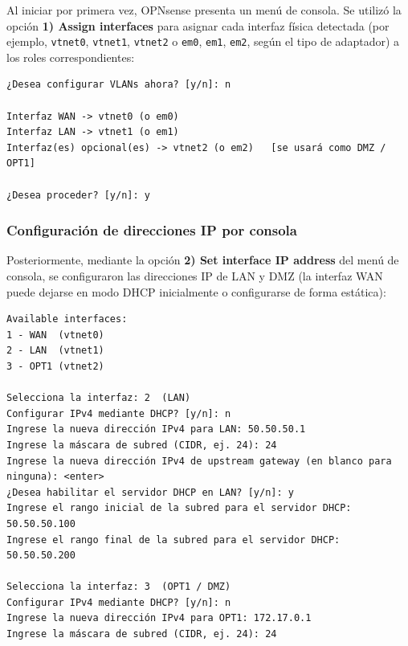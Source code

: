 \documentclass{article}
\renewcommand{\_}{\oldunderscore\hskip0pt\relax}
\begin{document}
Al iniciar por primera vez, OPNsense presenta un menú de consola. Se
utilizó la opción \textbf{1) Assign interfaces} para asignar cada
interfaz física detectada (por ejemplo, \texttt{vtnet0},
\texttt{vtnet1}, \texttt{vtnet2} o \texttt{em0}, \texttt{em1},
\texttt{em2}, según el tipo de adaptador) a los roles correspondientes:

\begin{Verbatim}[fontsize=\footnotesize,frame=single,rulecolor=\color{codebg},fillcolor=\color{codebg},framesep=2mm,xleftmargin=1mm,xrightmargin=1mm,breaklines=true,breakanywhere=true,breaksymbolleft={},breaksymbolright={}]
¿Desea configurar VLANs ahora? [y/n]: n

Interfaz WAN -> vtnet0 (o em0)
Interfaz LAN -> vtnet1 (o em1)
Interfaz(es) opcional(es) -> vtnet2 (o em2)   [se usará como DMZ / OPT1]

¿Desea proceder? [y/n]: y
\end{Verbatim}

\hypertarget{configuraciuxf3n-de-direcciones-ip-por-consola}{%
\subsubsection{Configuración de direcciones IP por
consola}\label{configuraciuxf3n-de-direcciones-ip-por-consola}}

Posteriormente, mediante la opción \textbf{2) Set interface IP address}
del menú de consola, se configuraron las direcciones IP de LAN y DMZ (la
interfaz WAN puede dejarse en modo DHCP inicialmente o configurarse de
forma estática):

\begin{Verbatim}[fontsize=\footnotesize,frame=single,rulecolor=\color{codebg},fillcolor=\color{codebg},framesep=2mm,xleftmargin=1mm,xrightmargin=1mm,breaklines=true,breakanywhere=true,breaksymbolleft={},breaksymbolright={}]
Available interfaces:
1 - WAN  (vtnet0)
2 - LAN  (vtnet1)
3 - OPT1 (vtnet2)

Selecciona la interfaz: 2  (LAN)
Configurar IPv4 mediante DHCP? [y/n]: n
Ingrese la nueva dirección IPv4 para LAN: 50.50.50.1
Ingrese la máscara de subred (CIDR, ej. 24): 24
Ingrese la nueva dirección IPv4 de upstream gateway (en blanco para ninguna): <enter>
¿Desea habilitar el servidor DHCP en LAN? [y/n]: y
Ingrese el rango inicial de la subred para el servidor DHCP: 50.50.50.100
Ingrese el rango final de la subred para el servidor DHCP: 50.50.50.200

Selecciona la interfaz: 3  (OPT1 / DMZ)
Configurar IPv4 mediante DHCP? [y/n]: n
Ingrese la nueva dirección IPv4 para OPT1: 172.17.0.1
Ingrese la máscara de subred (CIDR, ej. 24): 24
\end{Verbatim}
\end{document}
